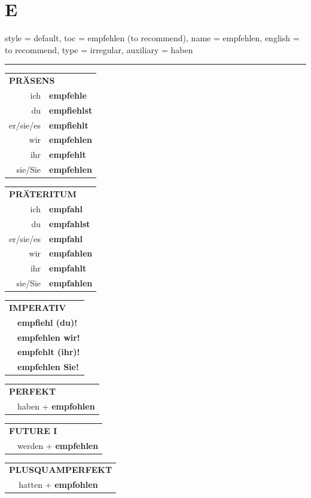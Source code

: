 \section{E}

\begin{verbentry}{
  style = {default},
  toc = {empfehlen (to recommend)},
  name = {empfehlen},
  english = {to recommend},
  type = {irregular},
  auxiliary = {haben}
}


\vspace{5pt}
\hrule
\vspace{5pt}

\begin{tabular}{rl}
\multicolumn{2}{l}{\textbf{PRÄSENS}}\\
ich & \textbf{empfehle}\\
du & \textbf{empfiehlst}\\
er/sie/es & \textbf{empfiehlt}\\
wir & \textbf{empfehlen}\\
ihr & \textbf{empfehlt}\\
sie/Sie & \textbf{empfehlen}\\
\end{tabular}
\hfill
\begin{tabular}{rl}
\multicolumn{2}{l}{\textbf{PRÄTERITUM}}\\
ich & \textbf{empfahl}\\
du & \textbf{empfahlst}\\
er/sie/es & \textbf{empfahl}\\
wir & \textbf{empfahlen}\\
ihr & \textbf{empfahlt}\\
sie/Sie & \textbf{empfahlen}\\
\end{tabular}
\hfill
\begin{tabular}{rl}
\multicolumn{2}{l}{\textbf{IMPERATIV}}\\
& \textbf{empfiehl (du)!}\\
& \textbf{empfehlen wir!}\\
& \textbf{empfehlt (ihr)!}\\
& \textbf{empfehlen Sie!}\\
\end{tabular}

\vspace{10pt}

\begin{tabular}{rl}
\multicolumn{2}{l}{\textbf{PERFEKT}}\\
& haben + \textbf{empfohlen}\\
\end{tabular}
\hfill
\begin{tabular}{rl}
\multicolumn{2}{l}{\textbf{FUTURE I}}\\
& werden + \textbf{empfehlen}\\
\end{tabular}
\hfill
\begin{tabular}{rl}
\multicolumn{2}{l}{\textbf{PLUSQUAMPERFEKT}}\\
& hatten + \textbf{empfohlen}\\
\end{tabular}


\end{verbentry}

